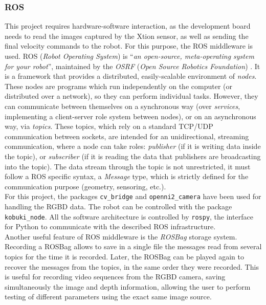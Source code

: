 \subsubsection{ROS}
This project requires hardware-software interaction, as the development board needs to read the images captured by the Xtion sensor, as well as sending the final velocity commands to the robot. For this purpose, the ROS middleware is used. ROS (\textit{Robot Operating System}) is ``\textit{an open-source, meta-operating system for your robot}'', maintained by the \emph{OSRF} (\textit{Open Source Robotics Foundation}) \cite{ros-intro}. It is a framework that provides a distributed, easily-scalable environment of \emph{nodes}. These nodes are programs which run independently on the computer (or distributed over a network), so they can perform individual tasks. However, they can communicate between themselves on a synchronous way (over \emph{services}, implementing a client-server role system between nodes), or on an asynchronous way, via \textit{topics}. These topics, which rely on a standard TCP/UDP communication between sockets, are intended for an unidirectional, streaming communication, where a node can take roles: \emph{publisher} (if it is writing data inside the topic), or \emph{subscriber} (if it is reading the data that publishers are broadcasting into the topic). The data stream through the topic is not unrestricted, it must follow a ROS specific syntax, a \emph{Message} type, which is strictly defined for the communication purpose (geometry, sensoring, etc.).\\

For this project, the packages \texttt{cv\_bridge} and \texttt{openni2\_camera} have been used for handling the RGBD data. The robot can be controlled with the package \texttt{kobuki\_node}. All the software architecture is controlled by \texttt{rospy}, the interface for Python to communicate with the described ROS infrastructure.\\

Another useful feature of ROS middleware is the \textit{ROSBag} storage system. Recording a ROSBag allows to save in a single file the messages read from several topics for the time it is recorded. Later, the ROSBag can be played again to recover the messages from the topics, in the same order they were recorded. This is useful for recording video sequences from the RGBD camera, saving simultaneously the image and depth information, allowing the user to perform testing of different parameters using the exact same image source.\\


